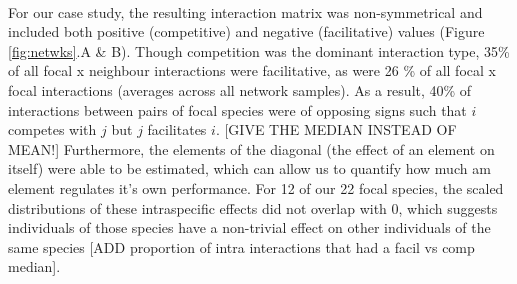 \documentclass[a4,12pt]{article}
\begin{document}



  


    \paragraph{}
     For our case study, the resulting interaction matrix was non-symmetrical and included both positive (competitive) and negative (facilitative) values (Figure \ref{fig:netwks}.A \& B). Though competition was the dominant interaction type,  35\% of all focal x neighbour interactions were facilitative, as were 26 \% of all focal x focal interactions (averages across all network samples). As a result, 40\% of interactions between pairs of focal species were of opposing signs such that $i$ competes with $j$ but $j$ facilitates $i$. [GIVE THE MEDIAN INSTEAD OF MEAN!]
     Furthermore, the elements of the diagonal (the effect of an element on itself) were able to be estimated, which can allow us to quantify how much am element regulates it's own performance. For 12 of our 22 focal species, the scaled distributions of these intraspecific effects did not overlap with 0, which suggests individuals of those species have a non-trivial effect on other individuals of the same species [ADD proportion of intra interactions that had a facil vs comp median]. 
\end{document}
